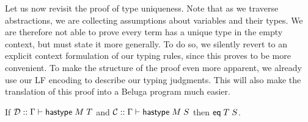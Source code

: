 Let us now revisit the proof of type uniqueness. Note that as we traverse
abstractions, we are collecting assumptions about variables and their
types. We are therefore not able to prove every term has a unique type
in the empty context, but must state it more generally. To do so, we
silently revert to an explicit context formulation of our typing
rules, since this proves to be more convenient. To make the structure
of the proof even more apparent, we already use our LF encoding to
describe our typing judgments. This will also make the translation of
this proof into a Beluga program much easier.

\begin{theorem}$\;$\\
If $\mathbin{{\mathcal{D}} :: \Gamma \vdash \mathsf{hastype}\;M\;T }$ and $\mathbin{{\mathcal{C}} :: \Gamma \vdash \mathsf{hastype}\;M\;S }$
then $\mathsf{eq}\;T\;S$.
\end{theorem}
